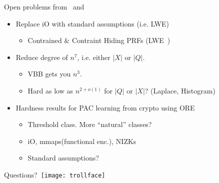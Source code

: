 \begin{frame}{Open problems from~\cite{conf/tcc/KowalczykMUZ16} and~\cite{conf/tcc/BunZ16}}
\begin{itemize}
\item Replace iO with standard assumptions (i.e. LWE)
  \begin{itemize}
  \item Contrained \& Contraint Hiding PRFs (LWE~\cite{journals/iacr/BonehKM17,journals/iacr/CanettiC17})
  \end{itemize}
\item Reduce degree of $n^7$, i.e. either $|X|$ or $|Q|$. 
  \begin{itemize}
  \item VBB gets you $n^3$. 
  \item Hard as low as $n^{2+o(1)}$ for $|Q|$ or $|X|$? (Laplace, Histogram)
  \end{itemize}
\item Hardness results for PAC learning from crypto using ORE
  \begin{itemize}
      \item Threshold class. More ``natural'' classes?
      \item iO, mmaps(functional enc.), NIZKs
      \item Standard assumptions?
  \end{itemize}
\end{itemize}
\pause
\begin{center}
  {\Large Questions?}~\texttt{[image: trollface]}
\end{center}
\end{frame}
